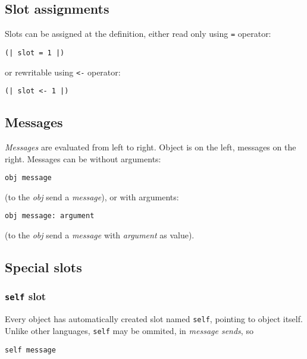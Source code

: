 \documentclass[10pt]{article}
\begin{document}
\begin{multicols*}{3}
\subsection{Slot assignments}
Slots can be assigned at the definition, either read only using \texttt{=} operator:

\begin{lstlisting}
(| slot = 1 |)
\end{lstlisting}

or rewritable using \texttt{<-} operator: %

\begin{lstlisting}
(| slot <- 1 |)
\end{lstlisting}




\subsection{Messages}

\textit{Messages} are evaluated from left to right. Object is on the left, messages on the right. Messages can be without arguments:

\begin{lstlisting}
obj message
\end{lstlisting}

(to the \textit{obj} send a \textit{message}), or with arguments:

\begin{lstlisting}
obj message: argument
\end{lstlisting}

(to the \textit{obj} send a \textit{message} with \textit{argument} as value).




\subsection{Special slots}

\subsubsection{\texttt{self} slot}
Every object has automatically created slot named \texttt{self}, pointing to object itself. Unlike other languages, \texttt{self} may be ommited, in \textit{message sends}, so

\begin{lstlisting}
self message
\end{lstlisting}


\end{multicols*}
\end{document}
